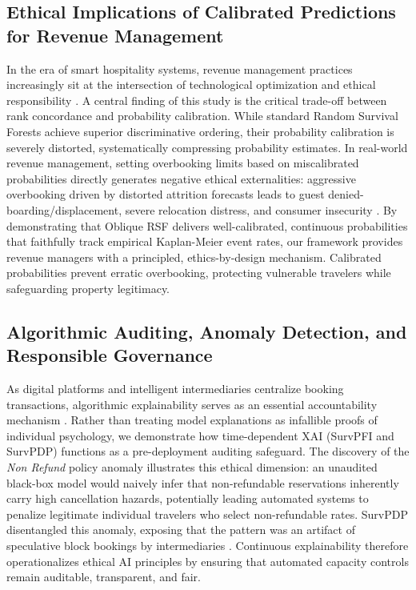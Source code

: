 \documentclass[pdflatex,iicol,sn-mathphys-ay]{sn-jnl}
\theoremstyle{thmstyleone}%
\theoremstyle{thmstyletwo}%
\theoremstyle{thmstylethree}%
\begin{document}
\subsection{Ethical Implications of Calibrated Predictions for Revenue Management}
In the era of smart hospitality systems, revenue management practices increasingly sit at the intersection of technological optimization and ethical responsibility \citep{law2025ethical}. A central finding of this study is the critical trade-off between rank concordance and probability calibration. While standard Random Survival Forests achieve superior discriminative ordering, their probability calibration is severely distorted, systematically compressing probability estimates. In real-world revenue management, setting overbooking limits based on miscalibrated probabilities directly generates negative ethical externalities: aggressive overbooking driven by distorted attrition forecasts leads to guest denied-boarding/displacement, severe relocation distress, and consumer insecurity \citep{lin2026developing}. By demonstrating that Oblique RSF delivers well-calibrated, continuous probabilities that faithfully track empirical Kaplan-Meier event rates, our framework provides revenue managers with a principled, ethics-by-design mechanism. Calibrated probabilities prevent erratic overbooking, protecting vulnerable travelers while safeguarding property legitimacy.

\subsection{Algorithmic Auditing, Anomaly Detection, and Responsible Governance}
As digital platforms and intelligent intermediaries centralize booking transactions, algorithmic explainability serves as an essential accountability mechanism \citep{dwivedi2025artificial, meske2022explainable}. Rather than treating model explanations as infallible proofs of individual psychology, we demonstrate how time-dependent XAI (SurvPFI and SurvPDP) functions as a pre-deployment auditing safeguard. The discovery of the \textit{Non Refund} policy anomaly illustrates this ethical dimension: an unaudited black-box model would naively infer that non-refundable reservations inherently carry high cancellation hazards, potentially leading automated systems to penalize legitimate individual travelers who select non-refundable rates. SurvPDP disentangled this anomaly, exposing that the pattern was an artifact of speculative block bookings by intermediaries \citep{antonio2019data}. Continuous explainability therefore operationalizes ethical AI principles by ensuring that automated capacity controls remain auditable, transparent, and fair.
\end{document}
